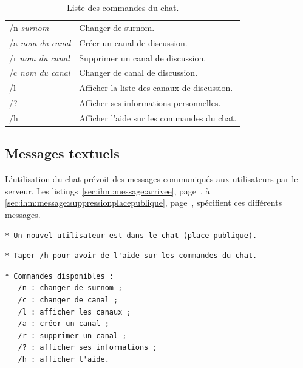 \medskip
\begin{table}[h!]
\renewcommand{\arraystretch}{1.3}
\begin{center}
\begin{tabular}{|l|l|}
\hline
   /n \textit{surnom} & Changer de surnom. \\
   /a \textit{nom du canal} & Créer un canal de discussion. \\
   /r \textit{nom du canal} & Supprimer un canal de discussion. \\
   /c \textit{nom du canal} & Changer de canal de discussion. \\
   /l & Afficher la liste des canaux de discussion. \\
   /? & Afficher ses informations personnelles. \\
   /h & Afficher l'aide sur les commandes du chat. \\
\hline
\end{tabular}
\caption{Liste des commandes du chat.}
\label{sec:cu:protocole:commandes}
\end{center}
\end{table}

\subsection{Messages textuels}
\label{sec:ihm:message}

L'utilisation du chat prévoit des messages communiqués aux utilisateurs par le serveur.
Les listings~\ref{sec:ihm:message:arrivee}, page~\pageref{sec:ihm:message:arrivee}, à \ref{sec:ihm:message:suppressionplacepublique}, page~\pageref{sec:ihm:message:suppressionplacepublique}, spécifient ces différents messages.

\bigskip
\begin{lstlisting}[caption={\normalsize{Message d'arrivée d'un utilisateur dans le chat {\footnotesize(à destination de la place publique)}.}},label={sec:ihm:message:arrivee}]
* Un nouvel utilisateur est dans le chat (place publique).
\end{lstlisting}

\medskip
\begin{lstlisting}[caption={\normalsize{Message d'accueil dans le chat.}},label={sec:ihm:message:accueil}]
* Taper /h pour avoir de l'aide sur les commandes du chat.
\end{lstlisting}

\medskip
\begin{lstlisting}[caption={\normalsize{Message d'aide sur les commandes du chat.}},label={sec:ihm:message:aide}]
* Commandes disponibles : 
   /n : changer de surnom ;
   /c : changer de canal ;
   /l : afficher les canaux ;
   /a : créer un canal ;
   /r : supprimer un canal ;
   /? : afficher ses informations ;
   /h : afficher l'aide.
\end{lstlisting}


